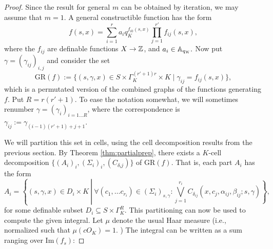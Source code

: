 \begin{proof}
Since the result for general $m$ can be obtained by iteration, we may assume that $m =1$. A general constructible function has the form
\[f(s,x) = \sum_{i=1}^r a_i q_K^{f_{i0}(s,x)} \prod_{j=1}^{r'}f_{ij}(s,x),\]
where the $f_{ij}$ are definable functions $X \to \ZZ$, and $a_i \in \AA_{q_K}.$
Now put $\gamma = (\gamma_{ij})_{i,j}$ and consider the set
\[\text{GR}(f):= \{(s,\gamma, x)\in S\times \Gamma_K^{(r'+1)r}\times K \mid  \gamma_{ij} = f_{ij}(s,x)\},\]
which is a permutated version of the combined graphs of the functions generating $f$. 
Put $R = r(r'+1)$. To ease the notation somewhat, we will sometimes renumber $\gamma =(\gamma_i)_{i=1\ldots R}$, where the correspondence is $\gamma_{ij}:= \gamma_{(i-1)(r'+1)+j+1}$.

We will partition this set in cells, using the cell decomposition results from the previous section. %
By Theorem \ref{thm:partialprep}, there exists a $K$-cell decomposition $\{(A_i)_i, (\Sigma_i)_i, (C_{\delta_ij})\}$ of $\text{GR}(f)$. That is, each part $A_i$ has the form
\[A_i = \left\{(s,\gamma, x) \in D_i \times K \ \left| \ \forall (c_1, \ldots c_{r_i}) \in (\Sigma_i)_{s,\gamma}: \bigvee_{j=1}^{r_i} C_{\delta_{ij}}(x,c_j, \alpha_{ij}, \beta_{ij};s,\gamma)\right\}\right.,\] 
for some definable subset $D_i \subseteq S \times \Gamma_K^R$. This partitioning can now be used to compute the given integral. Let $\mu$ denote the usual Haar measure (i.e., normalized such that $\mu(cO_K) =1$. ) The integral can be written as a sum ranging over $\text{Im}(f_s)$:


\end{proof}
